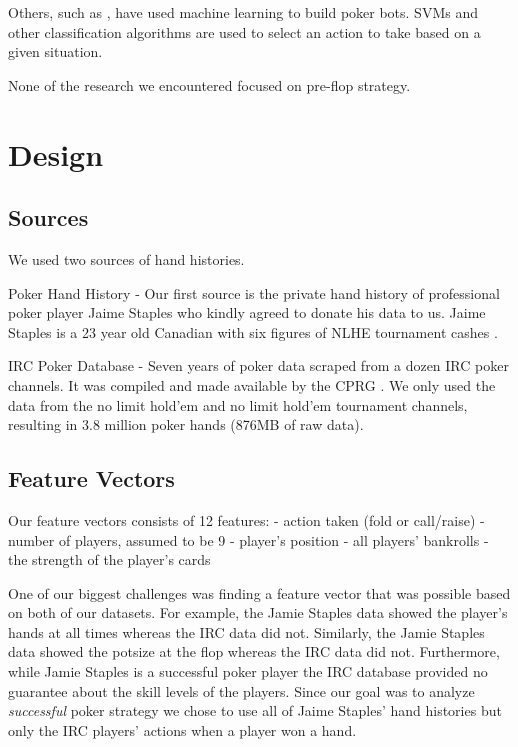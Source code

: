 \documentclass[twoside]{article}
\begin{document}
\begin{multicols}{2}
Others, such as \cite{holdemml}, have used machine learning to build poker bots. SVMs and other classification algorithms are used to select an action to take based on a given situation.

None of the research we encountered focused on pre-flop strategy. 


\section{Design}


\subsection{Sources}
We used two sources of hand histories.
\begin{compactitem}
\item{Poker Hand History} - Our first source is the private hand history of professional poker player Jaime Staples who kindly agreed to donate his data to us. Jaime Staples is a 23 year old Canadian with six figures of NLHE tournament cashes \cite{JaimeStaples}.
\item{IRC Poker Database} - Seven years of poker data scraped from a dozen IRC poker channels. It was compiled and made available by the CPRG \cite{IRCDatabase}. 
We only used the data from the no limit hold'em and  no limit hold'em tournament channels, resulting in 3.8 million poker hands (876MB of raw data). 
\end{compactitem}

\subsection{Feature Vectors}
Our feature vectors consists of 12 features: \newline
\indent - action taken (fold or call/raise) \newline
\indent - number of players, assumed to be 9\newline
\indent - player's position\newline
\indent - all players' bankrolls\newline
\indent - the strength of the player's cards\newline

One of our biggest challenges was finding a feature vector that was possible based on both of our datasets. For example, the Jamie Staples data showed the player's hands at all times whereas the IRC data did not. Similarly, the Jamie Staples data showed the potsize at the flop whereas the IRC data did not.  
Furthermore, while Jamie Staples is a successful poker player \cite{JaimeStaples} the IRC database provided no guarantee about the skill levels of the players. Since our goal was to analyze \textit{successful} poker strategy we chose to use all of Jaime Staples' hand histories but only the IRC players' actions when a player won a hand.


\end{multicols}
\end{document}

